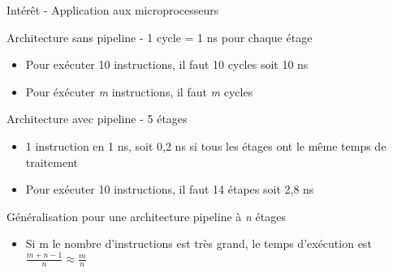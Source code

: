 %
\begin{Frame}{Intérêt - Application aux microprocesseurs}


\begin{block}{Architecture sans pipeline - 1 cycle = 1 ns pour chaque étage}
       \begin{center}
 	\begin{itemize}
         \item Pour exécuter 10 instructions, il faut 10 cycles soit 10 ns
	\item Pour éxécuter \emph{m} instructions, il faut \emph{m} cycles
        \end{itemize}
       \end{center}
      \end{block}   

\begin{block}{Architecture avec pipeline - 5 étages}
       \begin{center}
 	\begin{itemize}
	 \item 1 instruction en 1 ns, soit 0,2 ns si tous les étages ont le même temps de traitement
         \item Pour exécuter 10 instructions, il faut 14 étapes soit 2,8 ns
        \end{itemize}
       \end{center}
      \end{block}   

\begin{block}{Généralisation pour une architecture pipeline à \emph{n} étages}
       \begin{center}
 	\begin{itemize}
         \item Si m le nombre d'instructions est très grand, le temps d'exécution est
	$ \frac{m+n-1}{n} \approx \frac{m}{n} $
        \end{itemize}
       \end{center}
      \end{block}   

\end{Frame}


